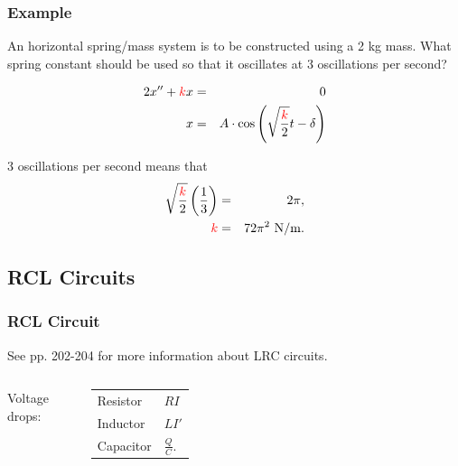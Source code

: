 \begin{frame}
  \frametitle{Example}

  An horizontal spring/mass system is to be constructed using a 2 kg
  mass. What spring constant should be used so that it oscillates at 3
  oscillations per second?

  \begin{eqnarray*}
    2 x'' + {\color{red}k}x & = & 0 \\
    x & = & A \cdot \cos\left( \sqrt{\frac{{\color{red}k}}{2}} t - \delta \right) \\
  \end{eqnarray*}

  {
    3 oscillations per second means that
    \begin{eqnarray*}
      \sqrt{\frac{{\color{red}k}}{2}} \left( \frac{1}{3} \right) & = & 2 \pi, \\
      {\color{red}k} & = & 72 \pi^2~\mathrm{N/m}.
    \end{eqnarray*}
  }

\end{frame}

\subsection{RCL Circuits}

\begin{frame}
  \frametitle{RCL Circuit}

  See pp. 202-204 for more information about LRC circuits.

  \begin{columns}
    

    Voltage drops: \\
    \begin{tabular}{l@{~$=$~}l}
      Resistor & $RI$ \\
      Inductor & $LI'$ \\
      Capacitor & $\frac{Q}{C}$.
    \end{tabular}
  \end{columns}


\end{frame}



